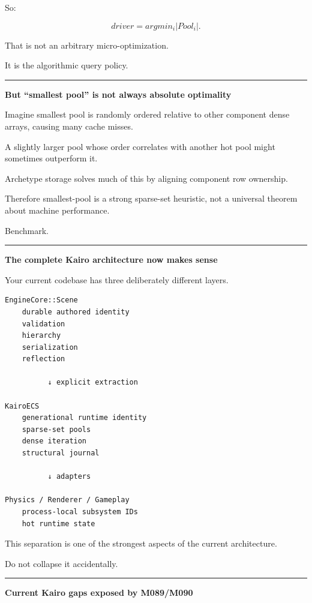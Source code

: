 So:

\[
\boxed{
driver=
argmin_i |Pool_i|.
}
\]

That is not an arbitrary micro-optimization.

It is the algorithmic query policy.

\begin{center}\rule{0.5\linewidth}{0.5pt}\end{center}

\textbf{But ``smallest pool'' is not always absolute optimality}

Imagine smallest pool is randomly ordered relative to other component dense arrays, causing many cache misses.

A slightly larger pool whose order correlates with another hot pool might sometimes outperform it.

Archetype storage solves much of this by aligning component row ownership.

Therefore smallest-pool is a strong sparse-set heuristic, not a universal theorem about machine performance.

Benchmark.

\begin{center}\rule{0.5\linewidth}{0.5pt}\end{center}

\textbf{The complete Kairo architecture now makes sense}

Your current codebase has three deliberately different layers.

\begin{verbatim}
EngineCore::Scene
    durable authored identity
    validation
    hierarchy
    serialization
    reflection

          ↓ explicit extraction

KairoECS
    generational runtime identity
    sparse-set pools
    dense iteration
    structural journal

          ↓ adapters

Physics / Renderer / Gameplay
    process-local subsystem IDs
    hot runtime state
\end{verbatim}

This separation is one of the strongest aspects of the current architecture.

Do not collapse it accidentally.

\begin{center}\rule{0.5\linewidth}{0.5pt}\end{center}

\textbf{Current Kairo gaps exposed by M089/M090}

